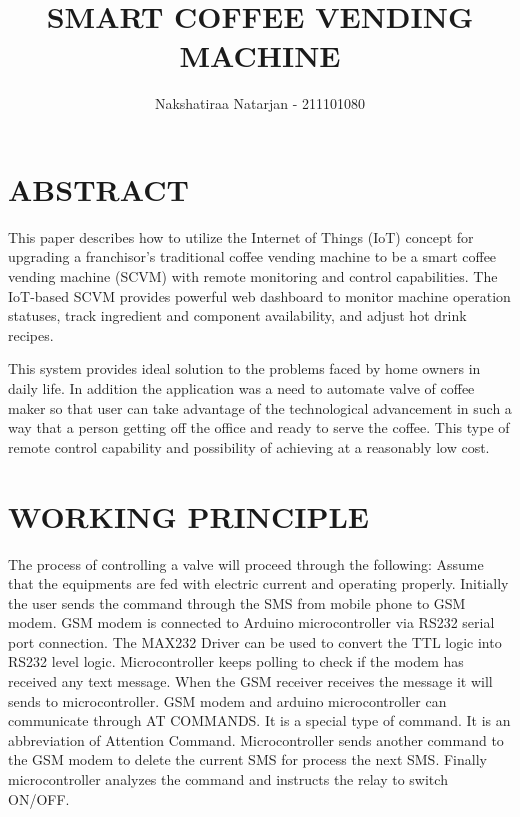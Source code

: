 \documentclass[letterpaper,12pt]{article}
\begin{document}
\title{SMART COFFEE VENDING MACHINE }
\author{Nakshatiraa Natarjan - 211101080}

\maketitle



\section{ABSTRACT}

This paper describes how to utilize the Internet of Things (IoT) concept for upgrading a franchisor’s traditional coffee vending machine to be a smart coffee vending machine (SCVM) with remote monitoring and control capabilities. The IoT-based SCVM provides powerful web dashboard to monitor machine operation statuses, track ingredient and component availability, and adjust hot drink recipes.


 

	This system provides ideal solution to the problems faced by home owners in daily life. In addition the application was a need to automate valve of coffee maker so that user can take advantage of the technological advancement in such a way that a person getting off the office and ready to serve the coffee. This type of remote control capability and possibility of achieving at a reasonably low cost.



\section{WORKING PRINCIPLE}

The process of controlling a valve will proceed through the following: Assume that the equipments are fed with electric current and operating properly. Initially the user sends the command through the SMS from mobile phone to GSM modem. GSM modem is connected to Arduino microcontroller via RS232 serial port connection. The MAX232 Driver can be used to convert the TTL logic into RS232 level logic. Microcontroller keeps polling to check if the
modem has received any text message. When the GSM receiver receives the message it will sends to microcontroller. GSM modem and arduino microcontroller can communicate through AT COMMANDS. It is a special type of command. It is an abbreviation of Attention Command. Microcontroller sends another command to the GSM modem to delete the current SMS for process the next SMS. Finally microcontroller analyzes the command and instructs the relay to switch ON/OFF.
\end{document}
